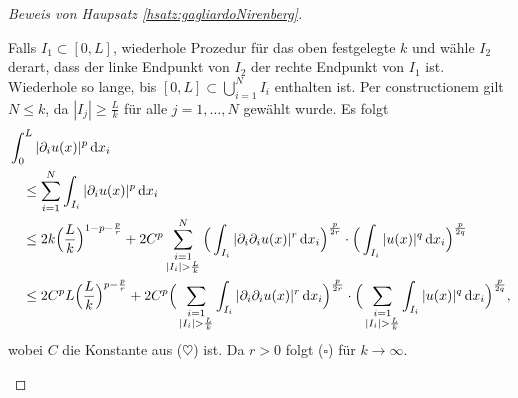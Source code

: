 \begin{proof}[Beweis von Haupsatz \ref{hsatz:gagliardoNirenberg}]
\begin{enumerate}
      Falls $I_1 \subset [0,L]$, wiederhole Prozedur für das oben festgelegte $k$ und wähle $I_2$ derart, dass der linke Endpunkt von $I_2$ der rechte Endpunkt von $I_1$ ist.
      Wiederhole so lange, bis $[0,L] \subset \bigcup_{i = 1}^N I_i$ enthalten ist.
      Per constructionem gilt $N \leq k$, da $|I_j| \geq \frac{L}{k}$ für alle $j = 1,\dots,N$ gewählt wurde.
      Es folgt
      \begin{align*}
        &\int_0^L |\partial_i u(x)|^p \, {\operatorname{d}\!{x}}_i \\
        &\quad\leq \sum_{i = 1}^N \int_{I_i} |\partial_i u(x)|^p \, {\operatorname{d}\!{x}}_i \\ 
        &\quad\leq 2k \Big( \frac{L}{k} \Big)^{1 - p - \frac{p}{r}} + 2C^p \sum_{\substack{i = 1 \\ |I_i| > \frac{L}{k}}}^N \Big( \int_{I_i} |\partial_i \partial_i u(x)|^r \, {\operatorname{d}\!{x}}_i \Big)^{\frac{p}{2r}} \cdot \Big( \int_{I_i} |u(x)|^q \, {\operatorname{d}\!{x}}_i \Big)^{\frac{p}{2q}} \\
        &\quad\leq 2C^p L \Big(\frac{L}{k}\Big)^{p - \frac{p}{r}} + 2C^p \Big( \sum_{\substack{i = 1 \\ |I_i| > \frac{L}{k}}} \int_{I_i} |\partial_i \partial_i u(x)|^r \, {\operatorname{d}\!{x}}_i \Big)^{\frac{p}{2r}} \cdot \Big( \sum_{\substack{i = 1 \\ |I_i| > \frac{L}{k}}} \int_{I_i} |u(x)|^q \, {\operatorname{d}\!{x}}_i \Big)^{\frac{p}{2q}},
      \end{align*}
      wobei $C$ die Konstante aus ($\heartsuit$) ist.
      Da $r > 0$ folgt ($\square$) für $k \to \infty$.


\end{enumerate}
\end{proof}
